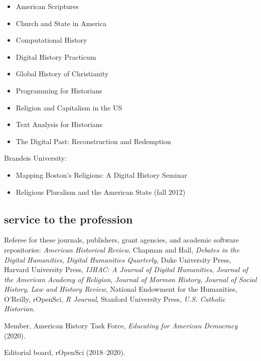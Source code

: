 \documentclass[11pt]{article}
\providecommand{\tightlist}{%
  \setlength{\itemsep}{0pt}\setlength{\parskip}{0pt}}
\begin{document}
\begin{itemize}
    \tightlist
  \item American Scriptures 
  \item Church and State in America
  \item Computational History 
  \item Digital History Practicum
  \item Global History of Christianity 
  \item Programming for Historians 
  \item Religion and Capitalism in the US 
  \item Text Analysis for Historians 
  \item The Digital Past: Reconstruction and Redemption
\end{itemize}

\vspace{-0.1in}

Brandeis University:

\vspace{-0.15in}

\begin{itemize}
    \tightlist
  \item
    Mapping Boston's Religions: A Digital History Seminar 
  \item
    Religious Pluralism and the American State (fall 2012)
\end{itemize}

\subsection{service to the profession}\label{service-profession}

Referee for these journals, publishers, grant agencies, and academic software 
repositories: \emph{American Historical Review}, Chapman and Hall, 
\emph{Debates in the Digital Humanities}, \emph{Digital Humanities Quarterly}, 
Duke University Press, Harvard University Press, \emph{IJHAC: A Journal of 
  Digital Humanities}, \emph{Journal of the American Academy of Religion}, 
\emph{Journal of Mormon History}, \emph{Journal of Social History}, \emph{Law 
  and History Review}, National Endowment for the Humanities, O'Reilly, 
rOpenSci, \emph{R Journal}, Stanford University Press, \emph{U.S. Catholic
Historian}.

Member, American History Task Force, \emph{Educating for American Democracy} (2020).

Editorial board, rOpenSci (2018--2020).
\end{document}
